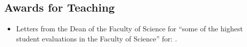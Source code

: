 \documentclass[10pt]{article}
\begin{document}
\nasubsection{
\subsection{Consultant} %
}



\subsection{Awards for Teaching} %

\begin{itemize}[leftmargin=5em]
    \item[] Letters from the Dean of the Faculty of Science for ``some of the highest student evaluations in the Faculty of Science'' for: .
\end{itemize}
\end{document}
